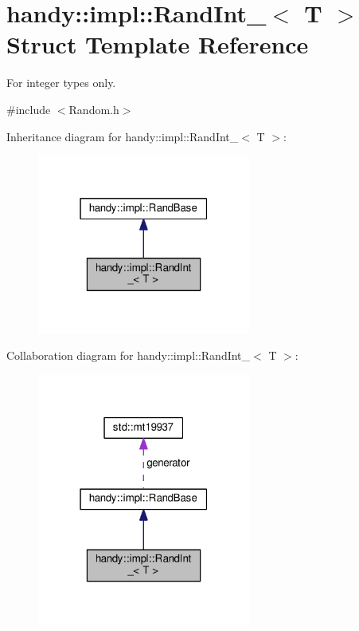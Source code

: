 \hypertarget{structhandy_1_1impl_1_1RandInt__}{}\section{handy\+:\+:impl\+:\+:Rand\+Int\+\_\+$<$ T $>$ Struct Template Reference}
\label{structhandy_1_1impl_1_1RandInt__}


For integer types only.  




{\ttfamily \#include $<$Random.\+h$>$}



Inheritance diagram for handy\+:\+:impl\+:\+:Rand\+Int\+\_\+$<$ T $>$\+:\nopagebreak
\begin{figure}[H]
\begin{center}
\leavevmode
\includegraphics[width=199pt]{structhandy_1_1impl_1_1RandInt____inherit__graph}
\end{center}
\end{figure}


Collaboration diagram for handy\+:\+:impl\+:\+:Rand\+Int\+\_\+$<$ T $>$\+:\nopagebreak
\begin{figure}[H]
\begin{center}
\leavevmode
\includegraphics[width=199pt]{structhandy_1_1impl_1_1RandInt____coll__graph}
\end{center}
\end{figure}
